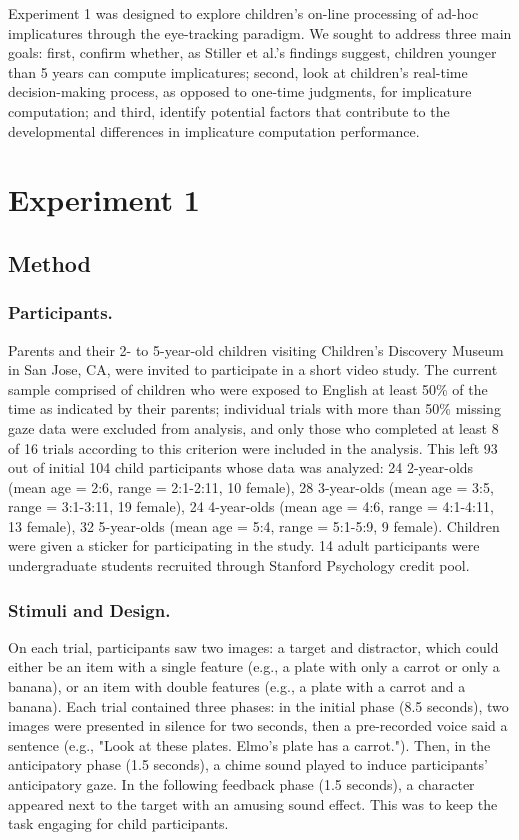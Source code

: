 \documentclass[10pt,letterpaper]{article}
\begin{document}
Experiment 1 was designed to explore children's on-line processing of ad-hoc implicatures through the eye-tracking paradigm. We sought to address three main goals: first, confirm whether, as Stiller et al.'s findings suggest, children younger than 5 years can compute implicatures; second, look at children's real-time decision-making process, as opposed to one-time judgments, for implicature computation; and third, identify potential factors that contribute to the developmental differences in implicature computation performance.


\section{Experiment 1}

\subsection{Method}

\subsubsection{Participants.}

Parents and their 2- to 5-year-old children visiting Children's Discovery Museum in San Jose, CA, were invited to participate in a short video study. The current sample comprised of children who were exposed to English at least 50\% of the time as indicated by their parents; individual trials with more than 50\% missing gaze data were excluded from analysis, and only those who completed at least 8 of 16 trials according to this criterion were included in the analysis. This left 93 out of initial 104 child participants whose data was analyzed: 24 2-year-olds (mean age = 2:6, range = 2:1-2:11, 10 female), 28 3-year-olds (mean age = 3:5, range = 3:1-3:11, 19 female), 24 4-year-olds (mean age = 4:6, range = 4:1-4:11, 13 female), 32 5-year-olds (mean age = 5:4, range = 5:1-5:9, 9 female). Children were given a sticker for participating in the study. 14 adult participants were undergraduate students recruited through Stanford Psychology credit pool.

\vspace{12pt}

\subsubsection{Stimuli and Design.}

On each trial, participants saw two images: a target and distractor, which could either be an item with a single feature (e.g., a plate with only a carrot or only a banana), or an item with double features (e.g., a plate with a carrot and a banana). Each trial contained three phases: in the initial phase (8.5 seconds), two images were presented in silence for two seconds, then a pre-recorded voice said a sentence (e.g., "Look at these plates. Elmo's plate has a carrot."). Then, in the anticipatory phase (1.5 seconds), a chime sound played to induce participants' anticipatory gaze. In the following feedback phase (1.5 seconds), a character appeared next to the target with an amusing sound effect. This was to keep the task engaging for child participants.
\end{document}
